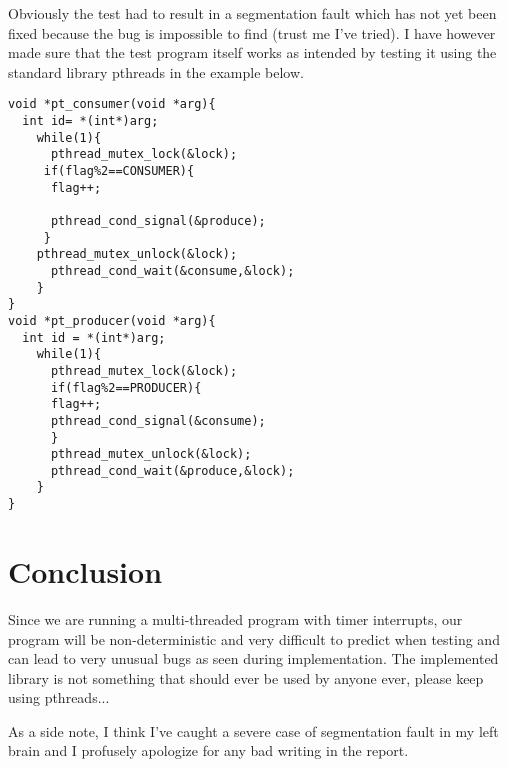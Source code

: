 \documentclass[12pt]{article}
\begin{document}
Obviously the test had to result in a segmentation fault which has not yet been fixed because the bug is impossible to find (trust me I've tried). I have however made sure that the test program itself works as intended by testing it using the standard library pthreads in the example below.

\begin{lstlisting}
void *pt_consumer(void *arg){
  int id= *(int*)arg;
    while(1){
      pthread_mutex_lock(&lock);
     if(flag%2==CONSUMER){
      flag++;

      pthread_cond_signal(&produce);
     }
    pthread_mutex_unlock(&lock);
      pthread_cond_wait(&consume,&lock);
    }
}
void *pt_producer(void *arg){
  int id = *(int*)arg;
    while(1){
      pthread_mutex_lock(&lock);
      if(flag%2==PRODUCER){
      flag++;
      pthread_cond_signal(&consume);
      }
      pthread_mutex_unlock(&lock);
      pthread_cond_wait(&produce,&lock);
    }
}
\end{lstlisting}

\section{Conclusion}
Since we are running a multi-threaded program with timer interrupts, our program will be non-deterministic and very difficult to predict when testing and can lead to very unusual bugs as seen during implementation. The implemented library is not something that should ever be used by anyone ever, please keep using pthreads...




As a side note, I think I've caught a severe case of segmentation fault in my left brain and I profusely apologize for any bad writing in the report.
\end{document}
